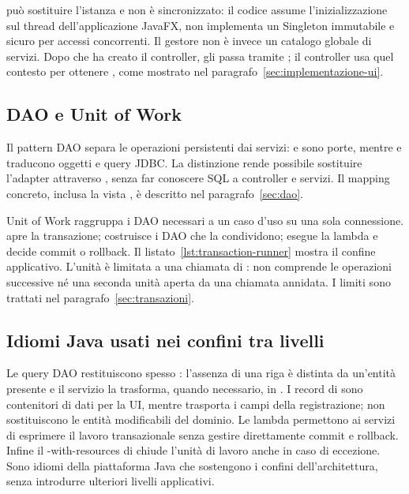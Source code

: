  può sostituire l'istanza e non è sincronizzato: il codice assume l'inizializzazione sul thread dell'applicazione JavaFX, non implementa un Singleton immutabile e sicuro per accessi concorrenti. Il gestore non è invece un catalogo globale di servizi. Dopo che  ha creato il controller,  gli passa  tramite ; il controller usa quel contesto per ottenere , come mostrato nel paragrafo~\ref{sec:implementazione-ui}.

\subsection{DAO e Unit of Work}
Il pattern DAO separa le operazioni persistenti dai servizi:  e  sono porte, mentre  e  traducono oggetti e query JDBC. La distinzione rende possibile sostituire l'adapter attraverso , senza far conoscere SQL a controller e servizi. Il mapping concreto, inclusa la vista , è descritto nel paragrafo~\ref{sec:dao}.

Unit of Work raggruppa i DAO necessari a un caso d'uso su una sola connessione.  apre la transazione;  costruisce i DAO che la condividono;  esegue la lambda e decide commit o rollback. Il listato~\ref{lst:transaction-runner} mostra il confine applicativo. L'unità è limitata a una chiamata di : non comprende le operazioni successive né una seconda unità aperta da una chiamata annidata. I limiti sono trattati nel paragrafo~\ref{sec:transazioni}.

\subsection{Idiomi Java usati nei confini tra livelli}
Le query DAO restituiscono spesso : l'assenza di una riga è distinta da un'entità presente e il servizio la trasforma, quando necessario, in . I record di  sono contenitori di dati per la UI, mentre  trasporta i campi della registrazione; non sostituiscono le entità modificabili del dominio. Le lambda  permettono ai servizi di esprimere il lavoro transazionale senza gestire direttamente commit e rollback. Infine il -with-resources di  chiude l'unità di lavoro anche in caso di eccezione. Sono idiomi della piattaforma Java che sostengono i confini dell'architettura, senza introdurre ulteriori livelli applicativi.
